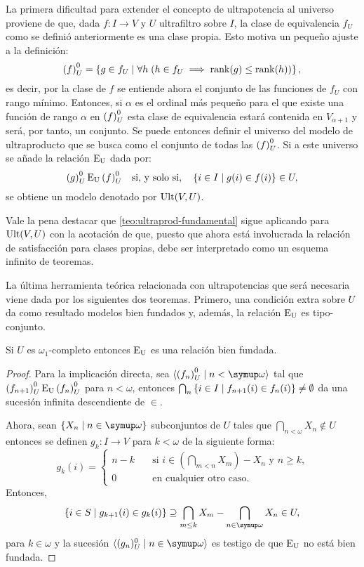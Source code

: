 La primera dificultad para extender el concepto de ultrapotencia al universo
proviene de que, dada $f\colon I\to V$ y $U$ ultrafiltro sobre $I$,
la clase de equivalencia $f_U$ como se definió anteriormente es una clase propia.
Esto motiva un pequeño ajuste a la definición:
\[
    {(f)}_U^0 = \left\{ g \in f_U\mid \forall h\; (h\in f_U\implies \operatorname{rank}(g)\leq\operatorname{rank}(h)) \right\},
\]
es decir, por la clase de $f$ se entiende ahora el conjunto de las funciones
de $f_U$ con rango mínimo. Entonces, si $\alpha$ es el ordinal más pequeño para
el que existe una función de rango $\alpha$ en ${(f)}_U^0$ esta clase de equivalencia estará
contenida en $V_{\alpha+1}$ y será, por tanto, un conjunto. Se puede entonces definir
el universo del modelo de ultraproducto que se busca como el conjunto de todas las ${(f)}_U^0$.
Si a este universo se añade la relación $\operatorname{E_U}$ dada por:
\[
    {(g)}_U^0 \operatorname{E_U} {(f)}_U^0
    \quad\text{si, y solo si,}\quad
    \left\{ i\in I\mid g(i)\in f(i) \right\}\in U,
\]
se obtiene un modelo
denotado por $\operatorname{Ult}(V,U)$.

Vale la pena destacar que \ref{teo:ultraprod-fundamental} sigue aplicando para
$\operatorname{Ult}(V,U)$ con la acotación de que, puesto que ahora está involucrada la relación
de satisfacción para clases propias, debe ser interpretado como un esquema infinito de teoremas.

La última herramienta teórica relacionada con ultrapotencias que será necesaria viene
dada por los siguientes dos teoremas. Primero, una condición extra sobre $U$ da como resultado
modelos bien fundados y, además, la relación $\operatorname{E_U}$ es tipo-conjunto.

\begin{teo}\label{teo:Eu-well-founded}
    Si $U$ es $\omega_1$-completo entonces $\operatorname{E_U}$ es una relación bien fundada.
\end{teo}
\begin{proof}
    Para la implicación directa, sea $\seq{\ecl{f_n}\mid n<\omega}$ tal que
    ${(f_{n+1})}_U^0\operatorname{E_U}{(f_n)}_U^0$ para $n<\omega$,
    entonces $\bigcap_n\left\{ i\in I\mid f_{n+1}(i)\in f_n(i) \right\}\neq\emptyset$
    da una sucesión infinita descendiente de $\in$.

    Ahora, sean $\set{X_n\mid n\in\omega}$ subconjuntos de $U$ tales que
    $\bigcap_{n<\omega} X_n\notin U$ entonces se definen $g_k\colon I\to V$
    para $k<\omega$ de la siguiente forma:
    \[
        g_k(i) =
        \begin{cases}
          n-k\quad & \text{si $i\in(\bigcap_{m<n} X_m) - X_n$ y $n\geq k$,}\\
          0\quad & \text{en cualquier otro caso.}
        \end{cases}
    \]
    Entonces,
    \[
        \set{i\in S\mid g_{k+1}(i)\in g_k(i)}
        \supseteq
        \bigcap_{m\leq k} X_m - \bigcap_{n\in\omega} X_n
        \in U,
    \]
    para $k\in\omega$ y la sucesión $\seq{(g_n)_U^0\mid n\in\omega}$ es testigo de que $\operatorname{E_U}$
    no está bien fundada.
\end{proof}

